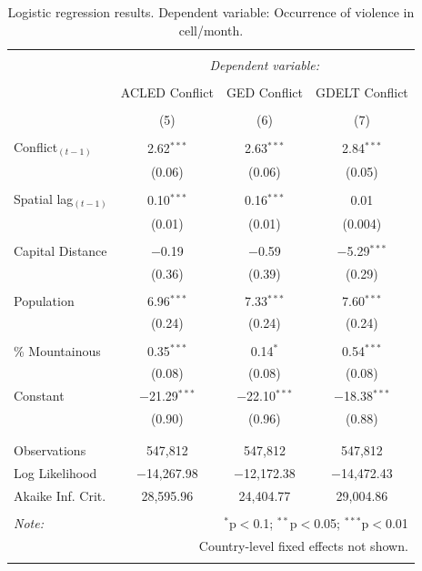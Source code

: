 \documentclass[hidelinks]{article}
\begin{document}
\vfill

\begin{table}[!htbp] \centering 
\begin{tabular}{@{\extracolsep{5pt}}lccc} 
\\[-1.8ex]\hline 
\hline \\[-1.8ex] 
 & \multicolumn{3}{c}{\textit{Dependent variable:}} \\ 
\cline{2-4} 
\\[-1.8ex] & ACLED Conflict & GED Conflict & GDELT Conflict \\ 
\\[-1.8ex] & (5) & (6) & (7)\\ 
\hline \\[-1.8ex] 
 Conflict$_{(t-1)}$ & 2.62$^{***}$ & 2.63$^{***}$ & 2.84$^{***}$ \\ 
  & (0.06) & (0.06)  & (0.05) \\ 
  & & & \\ 
 Spatial lag$_{(t-1)}$ & 0.10$^{***}$ & 0.16$^{***}$ & 0.01 \\ 
  & (0.01) & (0.01) & (0.004) \\ 
  & & & \\ 
 Capital Distance & $-$0.19 & $-$0.59 & $-$5.29$^{***}$ \\ 
  & (0.36) & (0.39) & (0.29) \\ 
  & & & \\ 
 Population & 6.96$^{***}$ & 7.33$^{***}$ & 7.60$^{***}$ \\ 
  & (0.24) & (0.24) & (0.24) \\ 
  & & & \\ 
 \% Mountainous & 0.35$^{***}$ & 0.14$^{*}$ & 0.54$^{***}$ \\ 
  & (0.08) & (0.08) & (0.08) \\ 
 Constant & $-$21.29$^{***}$ & $-$22.10$^{***}$ & $-$18.38$^{***}$ \\ 
  & (0.90) & (0.96) & (0.88) \\ 
  & & & \\ 
\hline \\[-1.8ex] 
Observations & 547,812 & 547,812 & 547,812 \\ 
Log Likelihood & $-$14,267.98 & $-$12,172.38 & $-$14,472.43 \\ 
Akaike Inf. Crit. & 28,595.96 & 24,404.77 & 29,004.86 \\ 
\hline 
\hline \\[-1.8ex] 
\textit{Note:}  & \multicolumn{3}{r}{$^{*}$p$<$0.1; $^{**}$p$<$0.05; $^{***}$p$<$0.01} \\ 
			& \multicolumn{3}{r}{Country-level fixed effects not shown.} \\ 
\normalsize 
\end{tabular} 
  \caption{Logistic regression results. Dependent variable: Occurrence of violence in cell/month.} \label{tab:regression2} 

\end{table} 
\end{document}
